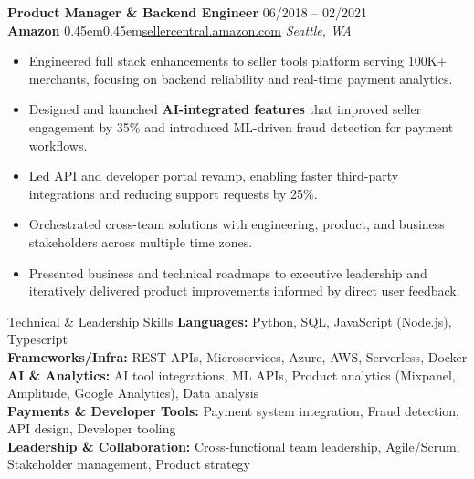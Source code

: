 \documentclass[10pt, letterpaper]{article}
\makeatletter
\renewcommand{\section}{%
  \@startsection{section}{1}{\z@}{10pt}{6pt}{%
    \Large\bfseries\color{black}%
  }%
}
\newcommand{\bull}{\kern0.45em\textbullet\kern0.45em}
\newcommand{\role}[1]{\textbf{#1}}
\newcommand{\org}[1]{\textbf{#1}}
\newcommand{\place}[1]{\textit{#1}}
\makeatother
\begin{document}
\role{Product Manager \& Backend Engineer} \hfill 06/2018 -- 02/2021 \\
\org{Amazon} \bull \href{https://sellercentral.amazon.com}{sellercentral.amazon.com} \hfill \place{Seattle, WA}
\begin{itemize}
  \item Engineered full stack enhancements to seller tools platform serving 100K+ merchants, focusing on backend reliability and real-time payment analytics.
  \item Designed and launched \textbf{AI-integrated features} that improved seller engagement by 35\% and introduced ML-driven fraud detection for payment workflows.
  \item Led API and developer portal revamp, enabling faster third-party integrations and reducing support requests by 25\%.
  \item Orchestrated cross-team solutions with engineering, product, and business stakeholders across multiple time zones.
  \item Presented business and technical roadmaps to executive leadership and iteratively delivered product improvements informed by direct user feedback.
\end{itemize}
\vspace{12pt}

\section{Technical \& Leadership Skills}
\textbf{Languages:} Python, SQL, JavaScript (Node.js), Typescript \\
\textbf{Frameworks/Infra:} REST APIs, Microservices, Azure, AWS, Serverless, Docker \\
\textbf{AI \& Analytics:} AI tool integrations, ML APIs, Product analytics (Mixpanel, Amplitude, Google Analytics), Data analysis \\
\textbf{Payments \& Developer Tools:} Payment system integration, Fraud detection, API design, Developer tooling \\
\textbf{Leadership \& Collaboration:} Cross-functional team leadership, Agile/Scrum, Stakeholder management, Product strategy

\end{document}

